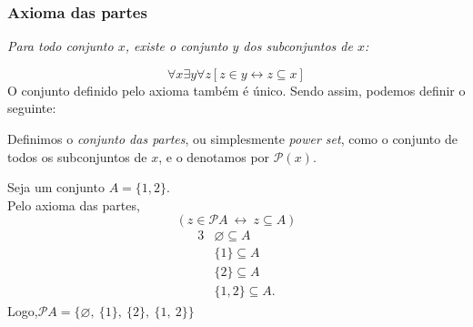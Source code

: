       \subsubsection{Axioma das partes} 
         \begin{stat}
            \textit{Para todo conjunto $x$, existe o conjunto $y$ dos subconjuntos de $x$:}
         \end{stat}
         $$\forall x \exists y \forall z [z \in y \leftrightarrow z \subseteq x]$$
         O conjunto definido pelo axioma também é único. Sendo assim, podemos definir o seguinte:
         \begin{definition}
            Definimos o \textit{conjunto das partes}, ou simplesmente \textit{power set}, como o conjunto de todos os subconjuntos de $x$, e o denotamos por $\mathcal{P}(x)$.
         \end{definition}
         \begin{exmp}
            Seja um conjunto $A = \{1,2\}.$\\
            Pelo axioma das partes, $$(z \in  \mathcal{P}A\ \leftrightarrow\ z \subseteq A)$$
            \begin{alignat*}{3}
               & \varnothing \subseteq A\\
               & \{1\} \subseteq A\\
               & \{2\} \subseteq A\\
               & \{1,2\} \subseteq A.
            \end{alignat*}
            Logo,\quad $\mathcal{P}A = \{\varnothing,\ \{1\},\ \{2\},\ \{1,\ 2\}\}$
         \end{exmp}

